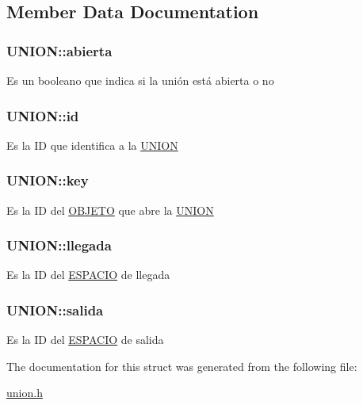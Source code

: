 \subsection{Member Data Documentation}
\hypertarget{structUNION_a8dab50459c23208c07cbcb893d41398d}{
\subsubsection[{abierta}]{ {\bf UNION::abierta}}}
\label{structUNION_a8dab50459c23208c07cbcb893d41398d}
Es un booleano que indica si la unión está abierta o no \hypertarget{structUNION_a8b9021fceafdff62398a23b3d3252d3e}{
\subsubsection[{id}]{ {\bf UNION::id}}}
\label{structUNION_a8b9021fceafdff62398a23b3d3252d3e}
Es la ID que identifica a la \hyperlink{structUNION}{UNION} \hypertarget{structUNION_a567a8ca18956fc6363d60a6e8e2e3a8c}{
\subsubsection[{key}]{ {\bf UNION::key}}}
\label{structUNION_a567a8ca18956fc6363d60a6e8e2e3a8c}
Es la ID del \hyperlink{structOBJETO}{OBJETO} que abre la \hyperlink{structUNION}{UNION} \hypertarget{structUNION_af5469a62faabf95b2ca099dc5a8f8597}{
\subsubsection[{llegada}]{ {\bf UNION::llegada}}}
\label{structUNION_af5469a62faabf95b2ca099dc5a8f8597}
Es la ID del \hyperlink{structESPACIO}{ESPACIO} de llegada \hypertarget{structUNION_a8a53fe8ab30b37bf9a9a1a2c1ad11ec6}{
\subsubsection[{salida}]{ {\bf UNION::salida}}}
\label{structUNION_a8a53fe8ab30b37bf9a9a1a2c1ad11ec6}
Es la ID del \hyperlink{structESPACIO}{ESPACIO} de salida 

The documentation for this struct was generated from the following file:\begin{DoxyCompactItemize}
\item 
\hyperlink{union_8h}{union.h}\end{DoxyCompactItemize}
